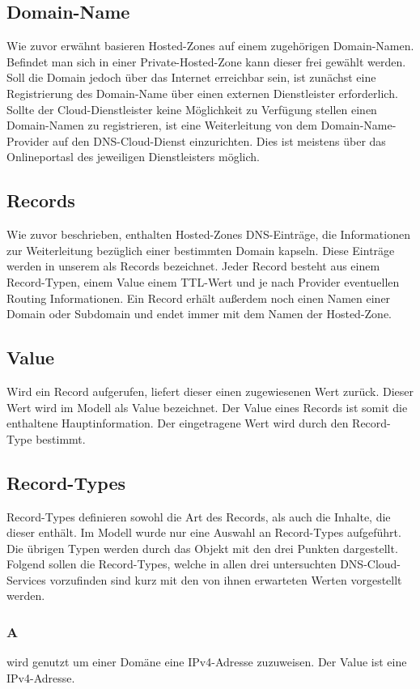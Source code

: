 \subsection{Domain-Name}
Wie zuvor erwähnt basieren Hosted-Zones auf einem zugehörigen Domain-Namen. Befindet man sich in einer Private-Hosted-Zone kann dieser frei gewählt werden. Soll die Domain jedoch über das Internet erreichbar sein, ist zunächst eine Registrierung des Domain-Name über einen externen Dienstleister erforderlich. Sollte der Cloud-Dienstleister keine Möglichkeit zu Verfügung stellen einen Domain-Namen zu registrieren, ist eine Weiterleitung von dem Domain-Name-Provider auf den DNS-Cloud-Dienst einzurichten. Dies ist meistens über das Onlineportasl des jeweiligen Dienstleisters möglich.

\subsection{Records}
Wie zuvor beschrieben, enthalten Hosted-Zones DNS-Einträge, die Informationen zur Weiterleitung bezüglich einer bestimmten Domain kapseln. Diese Einträge werden in unserem als Records bezeichnet. Jeder Record besteht aus einem Record-Typen, einem Value einem TTL-Wert und je nach Provider eventuellen Routing Informationen. Ein Record erhält außerdem noch einen Namen einer Domain oder Subdomain und endet immer mit dem Namen der Hosted-Zone.

\subsection{Value}
Wird ein Record aufgerufen, liefert dieser einen zugewiesenen Wert zurück. Dieser Wert wird im Modell als Value bezeichnet. Der Value eines Records ist somit die enthaltene Hauptinformation. Der eingetragene Wert wird durch den Record-Type bestimmt.


\subsection{Record-Types}
Record-Types definieren sowohl die Art des Records, als auch die Inhalte, die dieser enthält.
Im Modell wurde nur eine Auswahl an Record-Types aufgeführt. Die übrigen Typen werden durch das Objekt mit den drei Punkten dargestellt. Folgend sollen die Record-Types, welche in allen drei untersuchten DNS-Cloud-Services vorzufinden sind kurz mit den von ihnen erwarteten Werten vorgestellt werden.

\subsubsection{A}
wird genutzt um einer Domäne eine IPv4-Adresse zuzuweisen. Der Value ist eine IPv4-Adresse.

